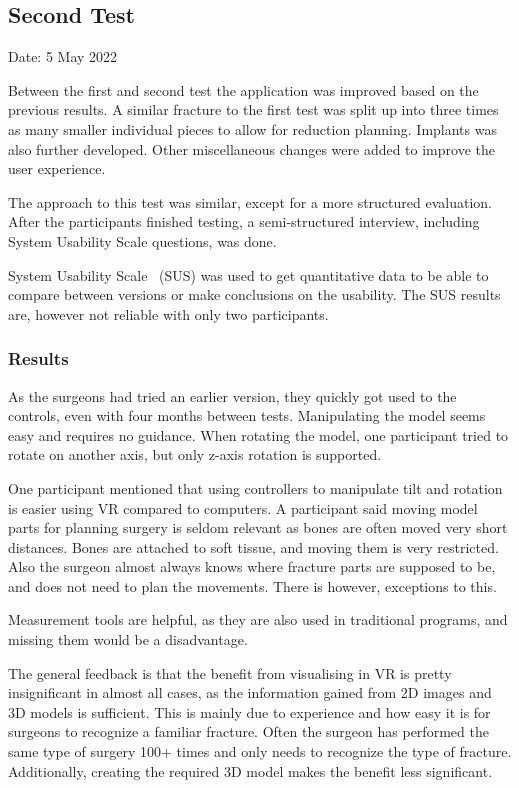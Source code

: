 \documentclass[a4paper]{report}
\begin{document}
\subsection{Second Test}
Date: 5 May 2022

Between the first and second test the application was improved based on the previous results. 
A similar fracture to the first test was split up into three times as many smaller individual pieces to allow for reduction planning. 
Implants was also further developed.
Other miscellaneous changes were added to improve the user experience.

The approach to this test was similar, except for a more structured evaluation. After the participants finished testing, a semi-structured interview, including System Usability Scale questions, was done.

System Usability Scale~\cite{system_usability_scale_sus_system_2013} (SUS) was used to get quantitative data to be able to compare between versions or make conclusions on the usability. The SUS results are, however not reliable with only two participants.

\subsubsection{Results}
As the surgeons had tried an earlier version, they quickly got used to the controls, even with four months between tests. Manipulating the model seems easy and requires no guidance. When rotating the model, one participant tried to rotate on another axis, but only z-axis rotation is supported.

One participant mentioned that using controllers to manipulate tilt and rotation is easier using VR compared to computers.
A participant said moving model parts for planning surgery is seldom relevant as bones are often moved very short distances. Bones are attached to soft tissue, and moving them is very restricted.
Also the surgeon almost always knows where fracture parts are supposed to be, and does not need to plan the movements. There is however, exceptions to this.

Measurement tools are helpful, as they are also used in traditional programs, and missing them would be a disadvantage.

The general feedback is that the benefit from visualising in VR is pretty insignificant in almost all cases, as the information gained from 2D images and 3D models is sufficient.
This is mainly due to experience and how easy it is for surgeons to recognize a familiar fracture. Often the surgeon has performed the same type of surgery 100+ times and only needs to recognize the type of fracture. Additionally, creating the required 3D model makes the benefit less significant.
\end{document}
